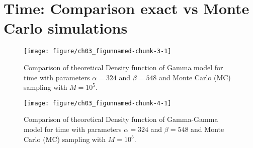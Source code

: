 \section{Time: Comparison exact vs Monte Carlo simulations}
%
%
%



\begin{figure}
\begin{knitrout}
\color{fgcolor}
\texttt{[image: figure/ch03\_figunnamed-chunk-3-1]} 
\end{knitrout}
\caption{Comparison of theoretical Density function of Gamma model for time with parameters $\alpha = 324$ and $\beta = 548$ and Monte Carlo (MC) sampling with $M=10^5$.}
\label{fig:3_3}
\end{figure}


\begin{figure}
\begin{knitrout}
\color{fgcolor}
\texttt{[image: figure/ch03\_figunnamed-chunk-4-1]} 
\end{knitrout}
\caption{Comparison of theoretical Density function of Gamma-Gamma model for time with parameters $\alpha = 324$ and $\beta = 548$ and Monte Carlo (MC) sampling with $M=10^5$.}
\label{fig:3_4}
\end{figure}






